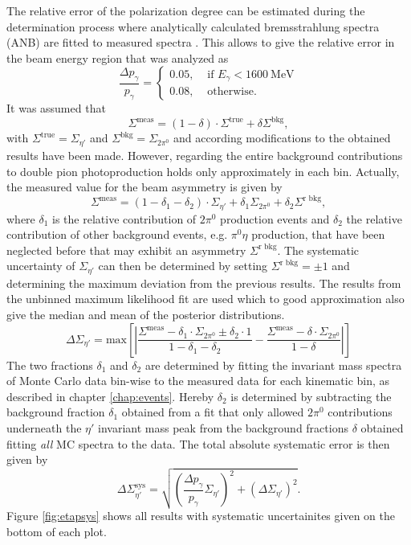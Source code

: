 The relative error of the polarization degree can be estimated during the determination process where analytically calculated bremsstrahlung spectra (ANB) are fitted to measured spectra \cite{farahphd}. This allows to give the relative error in the beam energy region that was analyzed as \cite{farahphd}
\begin{equation}
	\frac{\Delta p_\gamma}{p_\gamma}=
	\begin{cases}
		0.05,& \text{ if } E_\gamma<\SI{1600}{\mega\eV}\\
		0.08,& \text{ otherwise. }
	\end{cases}
\end{equation}
It was assumed that 
\begin{equation}
	\Sigma^\text{meas}=\left(1-\delta\right)\cdot\Sigma^\text{true}+\delta\Sigma^\text{bkg},
\end{equation}
with $\Sigma^\text{true}=\Sigma_{\eta'}$ and $\Sigma^\text{bkg}=\Sigma_{2\pi^0}$ and according modifications to the obtained results have been made. However, regarding the entire background contributions to double pion photoproduction holds only approximately in each bin. Actually, the measured value for the beam asymmetry is given by \begin{equation}
\Sigma^\text{meas}=\left(1-\delta_1-\delta_2\right)\cdot\Sigma_{\eta'}+\delta_1\Sigma_{2\pi^0}+\delta_2\Sigma^\text{r bkg},
\end{equation}
where $\delta_1$ is the relative contribution of $2\pi^0$ production events and $\delta_2$ the relative contribution of other background events, e.g. $\pi^0\eta$ production, that have been neglected before that may exhibit an asymmetry $\Sigma^\text{r bkg}$. The systematic uncertainty of $\Sigma_{\eta'}$ can then be determined by setting $\Sigma^\text{r bkg}=\pm1$ and determining the maximum deviation from the previous results. The results from the unbinned maximum likelihood fit are used which to good approximation also give the median and mean of the posterior distributions.
\begin{equation}
	\Delta\Sigma_{\eta'}=\text{max}\left[\left|\frac{\Sigma^\text{meas}-\delta_1\cdot\Sigma_{2\pi^0}\pm\delta_2\cdot1}{1-\delta_1-\delta_2}-\frac{\Sigma^\text{meas}-\delta\cdot\Sigma_{2\pi^0}}{1-\delta}\right|\right]
\end{equation}
The two fractions $\delta_1$ and $\delta_2$ are determined by fitting the invariant mass spectra of Monte Carlo data bin-wise to the measured data for each kinematic bin, as described in chapter \ref{chap:events}. Hereby $\delta_2$ is determined by subtracting the background fraction $\delta_1$ obtained from a fit that only allowed $2\pi^0$ contributions underneath the $\eta'$ invariant mass peak from the background fractions $\delta$ obtained fitting \emph{all} MC spectra to the data. The total absolute systematic error is then given by
\begin{equation}
	\Delta\Sigma_{\eta'}^\text{sys}=\sqrt{\left(\frac{\Delta p_\gamma}{p_\gamma}\Sigma_{\eta'}\right)^2+\left(\Delta\Sigma_{\eta'}\right)^2}.
\end{equation}
Figure \ref{fig:etapsys} shows all results with systematic uncertainites given on the bottom of each plot.

